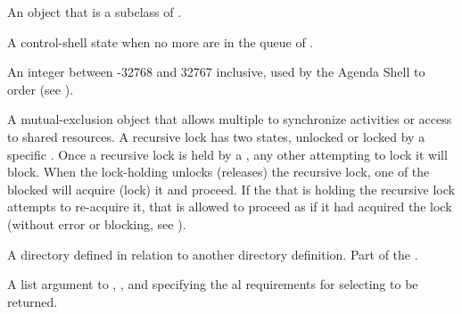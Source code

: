 \documentclass[10pt,twoside,english,pdftex]{article}
\begin{document}
\begin{glossary-list}
%
%
%
An object that is a subclass of \textbf{}.


\glent[quiescence]
%
%
A control-shell state when no more  are in the queue of
.


\glent[rating]
%
An integer between -32768 and 32767 inclusive, used by the Agenda Shell to
order  (see \textbf{}).


%
%
%
%
A mutual-exclusion object that allows multiple  to synchronize
activities or access to shared resources. A recursive lock has two states,
unlocked or locked by a specific . Once a recursive lock is held
by a , any other  attempting to lock it will
block. When the lock-holding  unlocks (releases) the recursive
lock, one of the blocked  will acquire (lock) it and proceed.
If the  that is holding the recursive lock attempts to
re-acquire it, that  is allowed to proceed as if it had acquired
the lock (without error or blocking, see ).


%
%
A directory defined in relation to another directory definition.
Part of the .


%
%
%
%
%
%
A list argument to \textbf{},
\textbf{}, and
\textbf{} specifying the
al requirements for selecting 
to be returned.


\end{glossary-list}
\end{document}

